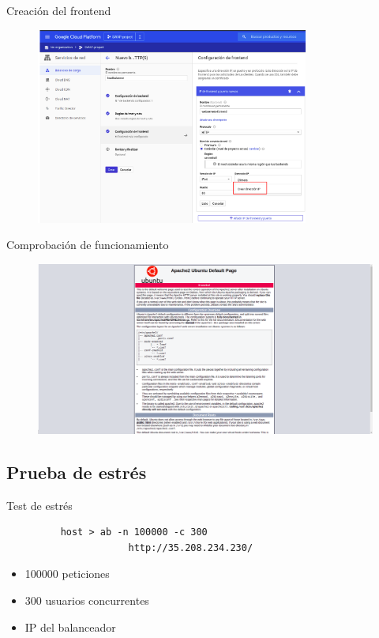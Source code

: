 \documentclass{beamer}
\begin{document}
\begin{frame}[fragile]{Creación del frontend}
  \begin{figure}[H]
		\centering
		\includegraphics[width=0.8\textwidth]{project/frontend.png}
	\end{figure}
\end{frame}

\begin{frame}[fragile]{Comprobación de funcionamiento}
  \begin{figure}[H]
		\centering
		\includegraphics[width=\textwidth]{project/load_balancer_ok.png}
	\end{figure}
\end{frame}

\subsection{Prueba de estrés}

\begin{frame}[fragile]{Test de estrés}
  \begin{figure}[H]
		\begin{lstlisting}
	host > ab -n 100000 -c 300
                http://35.208.234.230/
		\end{lstlisting}
\end{figure}
\begin{itemize}[<+->]
  \item 100000 peticiones
  \item 300 usuarios concurrentes
  \item IP del balanceador
\end{itemize}
\end{frame}
\end{document}
